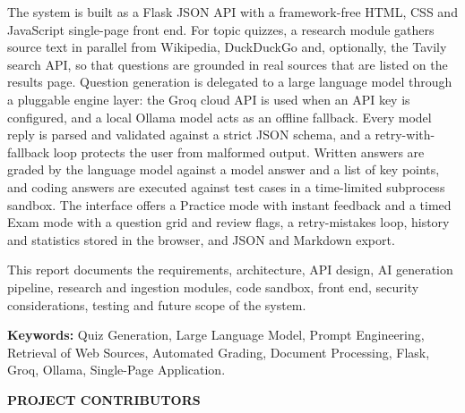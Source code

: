 \documentclass[12pt, a4paper]{report}
\begin{document}
\par\vspace{0.5cm}
The system is built as a Flask JSON API with a framework-free HTML, CSS and JavaScript single-page front end. For topic quizzes, a research module gathers source text in parallel from Wikipedia, DuckDuckGo and, optionally, the Tavily search API, so that questions are grounded in real sources that are listed on the results page. Question generation is delegated to a large language model through a pluggable engine layer: the Groq cloud API is used when an API key is configured, and a local Ollama model acts as an offline fallback. Every model reply is parsed and validated against a strict JSON schema, and a retry-with-fallback loop protects the user from malformed output. Written answers are graded by the language model against a model answer and a list of key points, and coding answers are executed against test cases in a time-limited subprocess sandbox. The interface offers a Practice mode with instant feedback and a timed Exam mode with a question grid and review flags, a retry-mistakes loop, history and statistics stored in the browser, and JSON and Markdown export.

\par\vspace{0.5cm}
This report documents the requirements, architecture, API design, AI generation pipeline, research and ingestion modules, code sandbox, front end, security considerations, testing and future scope of the system.

\par\vspace{0.5cm}
\noindent\textbf{Keywords:} Quiz Generation, Large Language Model, Prompt Engineering, Retrieval of Web Sources, Automated Grading, Document Processing, Flask, Groq, Ollama, Single-Page Application.

\newpage
{}
{}
\begin{center}
{\LARGE \textbf{PROJECT CONTRIBUTORS}}\\[0.8cm]
\end{center}
\end{document}
